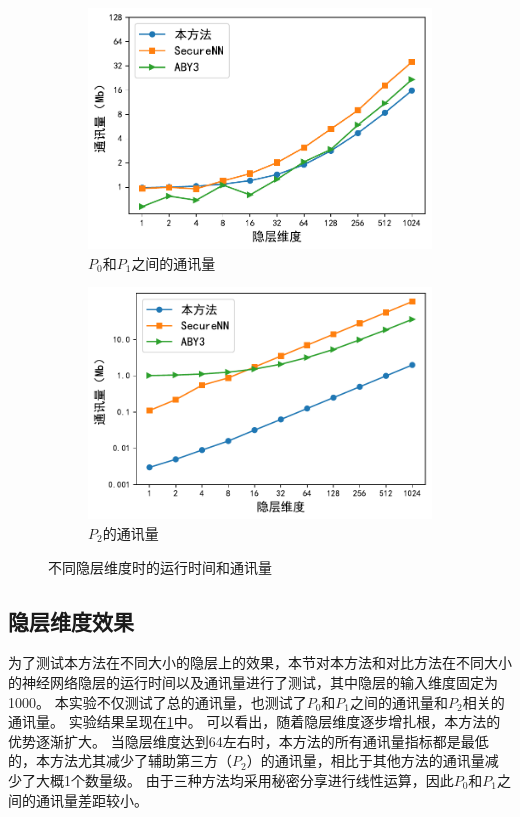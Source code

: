 \begin{figure}[h!]
    \begin{subfigure}[b]{0.48\linewidth}
    \centering
    \includegraphics[width=\linewidth]{Z_Resources/ss-perm_one-layer-c01.pdf}
    \caption{$P_0$和$P_1$之间的通讯量}
    \end{subfigure}
    \begin{subfigure}[b]{0.48\linewidth}
    \centering
    \includegraphics[width=\linewidth]{Z_Resources/ss-perm_one-layer-c2.pdf}
    \caption{$P_2$的通讯量}
    \end{subfigure}
\caption{不同隐层维度时的运行时间和通讯量}
\label{fig:ss-perm:layer-dim}
\end{figure}

\subsection{隐层维度效果}
为了测试本方法在不同大小的隐层上的效果，本节对本方法和对比方法在不同大小的神经网络隐层的运行时间以及通讯量进行了测试，其中隐层的输入维度固定为1000。
%
本实验不仅测试了总的通讯量，也测试了$P_0$和$P_1$之间的通讯量和$P_2$相关的通讯量。
%
实验结果呈现在\ref{fig:ss-perm:layer-dim}中。
%
可以看出，随着隐层维度逐步增扎根，本方法的优势逐渐扩大。
当隐层维度达到64左右时，本方法的所有通讯量指标都是最低的，本方法尤其减少了辅助第三方（$P_2$）的通讯量，相比于其他方法的通讯量减少了大概1个数量级。
由于三种方法均采用秘密分享进行线性运算，因此$P_0$和$P_1$之间的通讯量差距较小。

